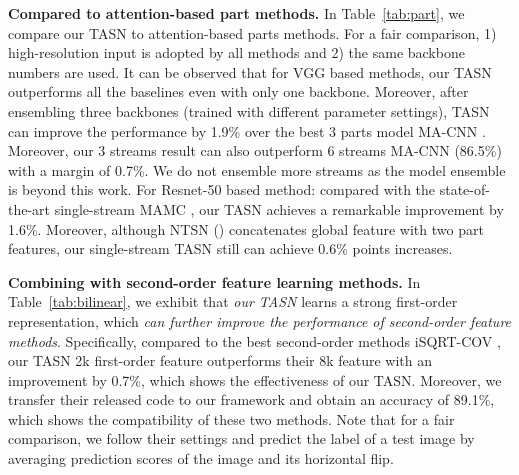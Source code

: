 \documentclass[10pt,twocolumn,letterpaper]{article}
\begin{document}
\textbf{Compared to attention-based part methods.}
In Table~\ref{tab:part}, we compare our TASN to attention-based parts methods. For a fair comparison, 1) high-resolution input is adopted by all methods and 2) the same backbone numbers are used. It can be observed that for VGG based methods, our TASN outperforms all the baselines even with only one backbone. Moreover, after ensembling three backbones (trained with different parameter settings), TASN can improve the performance by 1.9\% over the best 3 parts model MA-CNN \cite{Zheng_2017_ICCV}. Moreover, our 3 streams result can also outperform 6 streams MA-CNN (86.5\%) with a margin of 0.7\%. We do not ensemble more streams as the model ensemble is beyond this work. For Resnet-50 based method: compared with the state-of-the-art single-stream MAMC \cite{sun2018multi}, our TASN achieves a remarkable improvement by 1.6\%. Moreover, although NTSN \cite{yang2018learning} () concatenates global feature with two part features, our single-stream TASN still can achieve 0.6\% points increases.

\textbf{Combining with second-order feature learning methods.}
In Table~\ref{tab:bilinear}, we exhibit that \textit{our TASN} learns a strong first-order representation, which \textit{can further improve the performance of second-order feature methods}. Specifically, compared to the best second-order methods iSQRT-COV \cite{Li_2018_CVPR}, our TASN 2k first-order feature outperforms their 8k feature with an improvement by 0.7\%, which shows the effectiveness of our TASN. Moreover, we transfer their released code to our framework and obtain an accuracy of 89.1\%, which shows the compatibility of these two methods. Note that for a fair comparison, we follow their settings and predict the label of a test image by averaging prediction scores of the image and its horizontal flip.








\begin{table}
{\small
\caption{Extensive experiments on combining second-order feature learning methods.}
\label{tab:bilinear}
\begin{center}
\end{center}
}
 \vspace{-5 mm}
\end{table}
\end{document}
